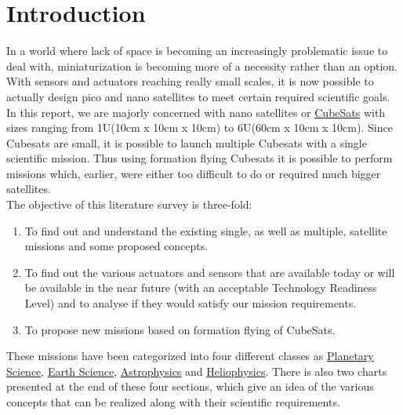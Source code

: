 \section{Introduction}
In a world where lack of space is becoming an increasingly problematic issue to deal with, miniaturization is becoming more of  a necessity rather than an option. With sensors and actuators reaching really small scales, it is now possible to actually design pico and nano satellites to meet certain required scientific goals. In this report, we are majorly concerned with nano satellites or \href{http://www.cubesat.org/images/developers/cds_rev12.pdf}{CubeSats} with sizes ranging from 1U(10cm x 10cm x 10cm) to 6U(60cm x 10cm x 10cm). Since Cubesats are small, it is possible to launch multiple Cubesats with a single scientific mission. Thus using formation flying Cubesats it is possible to perform missions which, earlier, were either too difficult to do or required much bigger satellites. \\

The objective of this literature survey is three-fold: 
\begin{enumerate}
\item To find out and understand the existing single, as well as multiple, satellite missions and some proposed concepts.
\item To find out the various actuators and sensors that are available today or will be available in the near future (with an acceptable Technology Readiness Level) and to analyse if they would satisfy our mission requirements. 
\item To propose new missions based on formation flying of CubeSats.
\end{enumerate}


These missions have been categorized into four different classes as \href{http://solarsystem.nasa.gov/multimedia/download-detail.cfm?DL_ID=742}{Planetary Science}, \href{http://www.nap.edu/catalog.php?record_id=11820}{Earth Science}, \href{http://www.nap.edu/catalog.php?record_id=12951}{Astrophysics} and \href{http://www.nap.edu/catalog.php?record_id=13060}{Heliophysics}. There is also two charts presented at the end of these four sections, which give an idea of the various concepts that can be realized along with their scientific requirements. 
